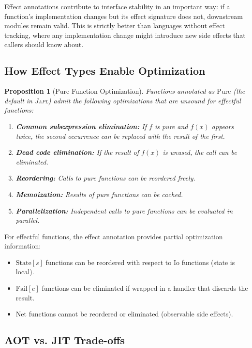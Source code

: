 \documentclass[11pt,twocolumn]{article}
\newtheorem{proposition}[theorem]{Proposition}
\newcommand{\japl}{\textsc{Japl}}
\begin{document}
Effect annotations contribute to interface stability in an important way: if a function's implementation changes but its effect signature does not, downstream modules remain valid.
This is strictly better than languages without effect tracking, where any implementation change might introduce new side effects that callers should know about.

\subsection{How Effect Types Enable Optimization}

\begin{proposition}[Pure Function Optimization]
Functions annotated as $\text{Pure}$ (the default in \japl{}) admit the following optimizations that are unsound for effectful functions:
\begin{enumerate}
\item \textbf{Common subexpression elimination:} If $f$ is pure and $f(x)$ appears twice, the second occurrence can be replaced with the result of the first.
\item \textbf{Dead code elimination:} If the result of $f(x)$ is unused, the call can be eliminated.
\item \textbf{Reordering:} Calls to pure functions can be reordered freely.
\item \textbf{Memoization:} Results of pure functions can be cached.
\item \textbf{Parallelization:} Independent calls to pure functions can be evaluated in parallel.
\end{enumerate}
\end{proposition}

For effectful functions, the effect annotation provides partial optimization information:
\begin{itemize}
\item $\text{State}[s]$ functions can be reordered with respect to $\text{Io}$ functions (state is local).
\item $\text{Fail}[e]$ functions can be eliminated if wrapped in a handler that discards the result.
\item $\text{Net}$ functions cannot be reordered or eliminated (observable side effects).
\end{itemize}

\subsection{AOT vs. JIT Trade-offs}
\end{document}
